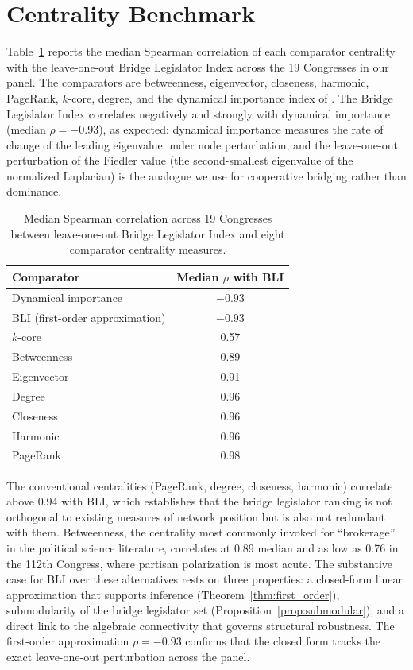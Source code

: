 \documentclass[12pt, a4paper]{article}
\begin{document}
\section{Centrality Benchmark}
\label{app:centrality}

Table~\ref{tab:centrality_comparison} reports the median Spearman correlation of each comparator centrality with the leave-one-out Bridge Legislator Index across the 19 Congresses in our panel. The comparators are betweenness, eigenvector, closeness, harmonic, PageRank, $k$-core, degree, and the dynamical importance index of \citet{restrepo2006characterizing}. The Bridge Legislator Index correlates negatively and strongly with dynamical importance (median $\rho = -0.93$), as expected: dynamical importance measures the rate of change of the leading eigenvalue under node perturbation, and the leave-one-out perturbation of the Fiedler value (the second-smallest eigenvalue of the normalized Laplacian) is the analogue we use for cooperative bridging rather than dominance.

\begin{table}[H]
\centering
\caption{Median Spearman correlation across 19 Congresses between leave-one-out Bridge Legislator Index and eight comparator centrality measures.}
\label{tab:centrality_comparison}
\small
\begin{tabular}{lc}
\toprule
Comparator & Median $\rho$ with BLI \\
\midrule
Dynamical importance & $-0.93$ \\
BLI (first-order approximation) & $-0.93$ \\
$k$-core & 0.57 \\
Betweenness & 0.89 \\
Eigenvector & 0.91 \\
Degree & 0.96 \\
Closeness & 0.96 \\
Harmonic & 0.96 \\
PageRank & 0.98 \\
\bottomrule
\end{tabular}
\end{table}

The conventional centralities (PageRank, degree, closeness, harmonic) correlate above 0.94 with BLI, which establishes that the bridge legislator ranking is not orthogonal to existing measures of network position but is also not redundant with them. Betweenness, the centrality most commonly invoked for ``brokerage'' in the political science literature, correlates at 0.89 median and as low as 0.76 in the 112th Congress, where partisan polarization is most acute. The substantive case for BLI over these alternatives rests on three properties: a closed-form linear approximation that supports inference (Theorem~\ref{thm:first_order}), submodularity of the bridge legislator set (Proposition~\ref{prop:submodular}), and a direct link to the algebraic connectivity that governs structural robustness. The first-order approximation $\rho = -0.93$ confirms that the closed form tracks the exact leave-one-out perturbation across the panel.
\end{document}
